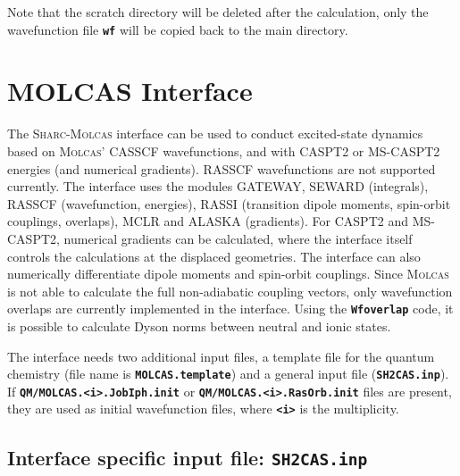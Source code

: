 \documentclass[a4paper,11pt,DIV=15,openany,twoside=false]{scrbook}
\newcommand{\sharc}{\textsc{Sharc}}
\newcommand{\ttt}[1]{\textbf{\texttt{#1}}}
\begin{document}
Note that the scratch directory will be deleted after the calculation, only the wavefunction file \ttt{wf} will be copied back to the main directory.


\section{MOLCAS Interface}\label{sec:int:molcas}

The \sharc-\textsc{Molcas} interface can be used to conduct excited-state dynamics based on \textsc{Molcas}' CASSCF wavefunctions, and with CASPT2 or MS-CASPT2 energies (and numerical gradients). 
RASSCF wavefunctions are not supported currently. 
The interface uses the modules GATEWAY, SEWARD (integrals), RASSCF (wavefunction, energies), RASSI (transition dipole moments, spin-orbit couplings, overlaps), MCLR and ALASKA (gradients). 
For CASPT2 and MS-CASPT2, numerical gradients can be calculated, where the interface itself controls the calculations at the displaced geometries. 
The interface can also numerically differentiate dipole moments and spin-orbit couplings.
Since \textsc{Molcas} is not able to calculate the full non-adiabatic coupling vectors, only wavefunction overlaps are currently implemented in the interface. 
Using the \ttt{Wfoverlap} code, it is possible to calculate Dyson norms between neutral and ionic states.


The interface needs two additional input files, a template file for the quantum chemistry (file name is \ttt{MOLCAS.template}) and a general input file (\ttt{SH2CAS.inp}). If \ttt{QM/MOLCAS.<i>.JobIph.init} or \ttt{QM/MOLCAS.<i>.RasOrb.init} files are present, they are used as initial wavefunction files, where \ttt{<i>} is the multiplicity. %

\subsection{Interface specific input file: \ttt{SH2CAS.inp}}
\end{document}
